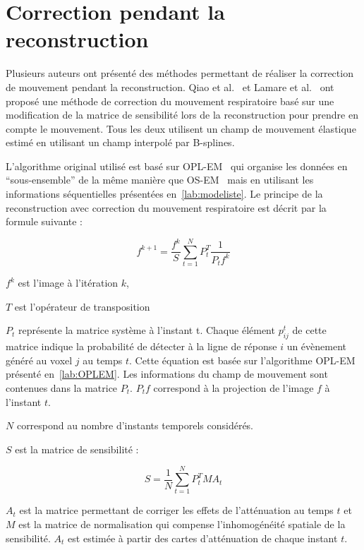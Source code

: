 \section{Correction pendant la reconstruction}
\label{lab:CorrpendantRecon}
Plusieurs auteurs ont présenté des méthodes permettant de réaliser la correction de mouvement pendant la reconstruction. Qiao et al.~\cite{qiao2006motion} et Lamare et al.~\cite{lamare2007list} ont proposé une méthode de correction du mouvement respiratoire basé sur une modification de la matrice de sensibilité lors de la reconstruction pour prendre en compte le mouvement. Tous les deux utilisent un champ de mouvement élastique estimé en utilisant un champ interpolé par B-splines.

L'algorithme original utilisé est basé sur OPL-EM~\cite{reader2002one} qui organise les données en ``sous-ensemble'' de la même manière que OS-EM~\cite{hudson1994accelerated} mais en utilisant les informations séquentielles présentées en~\ref{lab:modeliste}. Le principe de la reconstruction avec correction du mouvement respiratoire est décrit par la formule suivante :

\label{lab:corrMatSyst}
\begin{equation}
 f^{k+1}=\frac{f^k}{S} \sum_{t=1}^{N} P_t^T \frac{1}{P_t f^k} 
\label{lab:OPLLamara}
\end{equation}

$f^k$ est l'image à l'itération $k$,

$T$ est l'opérateur de transposition

$P_t$ représente la matrice système à l'instant t. Chaque élément $p_{ij}^t$ de cette matrice indique la probabilité de détecter à la ligne de réponse $i$ un évènement généré au voxel $j$ au temps $t$. Cette équation est basée sur l'algorithme OPL-EM présenté en~\ref{lab:OPLEM}. Les informations du champ de mouvement sont contenues dans la matrice $P_t$. $P_t f$ correspond à la projection de l'image $f$ à l'instant $t$.  

$N$ correspond au nombre d'instants temporels considérés.

$S$ est la matrice de sensibilité :

\begin{equation}
 S=\frac{1}{N} \sum_{t=1}^{N} P_t^T M A_t 
\end{equation}

 $A_t$ est la matrice permettant de corriger les effets de l'atténuation au temps $t$ et $M$ est la matrice de normalisation qui compense l'inhomogénéité spatiale de la sensibilité. $A_t$ est estimée à partir des cartes d'atténuation de chaque instant $t$.

